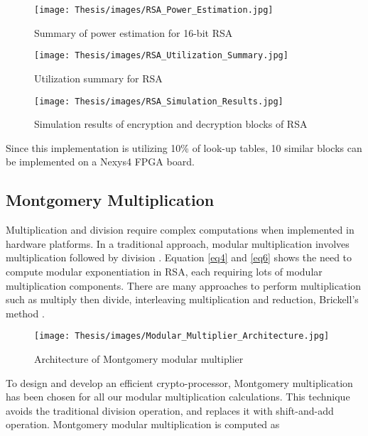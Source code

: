 \documentclass{cpp}
\begin{document}
\newpage

\begin{figure}[htp]
    \centering
    \texttt{[image: Thesis/images/RSA\_Power\_Estimation.jpg]}
    \caption{Summary of power estimation for 16-bit RSA}
    \label{fig:figure2}
\end{figure}

\begin{figure}[htp]
    \centering
    \texttt{[image: Thesis/images/RSA\_Utilization\_Summary.jpg]}
    \caption{Utilization summary for RSA}
    \label{fig:figure3}
\end{figure}

\newpage

\begin{figure*}[htp]
    \centering
    \texttt{[image: Thesis/images/RSA\_Simulation\_Results.jpg]}
    \caption{Simulation results of encryption and decryption blocks of RSA}
    \label{fig:figure4}
\end{figure*}

Since this implementation is utilizing 10\% of look-up tables, 10 similar blocks can be implemented on a Nexys4 FPGA board.

\subsection{Montgomery Multiplication}

Multiplication and division require complex computations when implemented in hardware platforms. In a traditional approach, modular multiplication involves multiplication followed by division \cite{hans:nils:sheueling:vipul:leonard}. Equation \eqref{eq4} and \eqref{eq6} shows the need to compute modular exponentiation in RSA, each requiring lots of modular multiplication components. There are many approaches to perform multiplication such as multiply then divide, interleaving multiplication and reduction, Brickell's method \cite{sushanta:manoranjan}.

\newpage

\begin{figure}[H]
    \centering
    \texttt{[image: Thesis/images/Modular\_Multiplier\_Architecture.jpg]}
    \caption{Architecture of Montgomery modular multiplier}
    \label{fig:figure5}
\end{figure}

\newpage

To design and develop an efficient crypto-processor, Montgomery multiplication  has been chosen for all our modular multiplication calculations. This technique avoids the traditional division operation, and replaces it with shift-and-add operation. Montgomery modular multiplication is computed as
\end{document}
